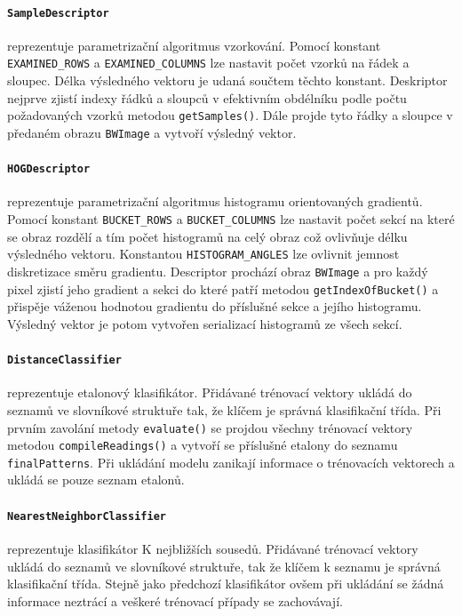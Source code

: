 \documentclass[12pt]{article}
\begin{document}
\paragraph{\texttt{SampleDescriptor}}
reprezentuje parametrizační algoritmus vzorkování. Pomocí konstant \texttt{EXAMINED\_ROWS} a \texttt{EXAMINED\_COLUMNS} lze nastavit počet vzorků na řádek a sloupec. Délka výsledného vektoru je udaná součtem těchto konstant. Deskriptor nejprve zjistí indexy řádků a sloupců v efektivním obdélníku podle počtu požadovaných vzorků metodou \texttt{getSamples()}. Dále projde tyto řádky a sloupce v předaném obrazu \texttt{BWImage} a vytvoří výsledný vektor.

\paragraph{\texttt{HOGDescriptor}}
reprezentuje parametrizační algoritmus histogramu orientovaných gradientů. Pomocí konstant \texttt{BUCKET\_ROWS} a \texttt{BUCKET\_COLUMNS} lze nastavit počet sekcí na které se obraz rozdělí a tím počet histogramů na celý obraz což ovlivňuje délku výsledného vektoru. Konstantou \texttt{HISTOGRAM\_ANGLES} lze ovlivnit jemnost diskretizace směru gradientu. Descriptor prochází obraz \texttt{BWImage} a pro každý pixel zjistí jeho gradient a sekci do které patří metodou \texttt{getIndexOfBucket()} a přispěje váženou hodnotou gradientu do příslušné sekce a jejího histogramu. Výsledný vektor je potom vytvořen serializací histogramů ze všech sekcí.

\paragraph{\texttt{\texttt{DistanceClassifier}}}
reprezentuje etalonový klasifikátor. Přidávané trénovací vektory ukládá do seznamů ve slovníkové struktuře tak, že klíčem je správná klasifikační třída. Při prvním zavolání metody \texttt{evaluate()} se projdou všechny trénovací vektory metodou \texttt{compileReadings()} a vytvoří se příslušné etalony do seznamu \texttt{finalPatterns}. Při ukládání modelu zanikají informace o trénovacích vektorech a ukládá se pouze seznam etalonů.

\paragraph{\texttt{NearestNeighborClassifier}}
reprezentuje klasifikátor K nejbližších sousedů.
Přidávané trénovací vektory ukládá do seznamů ve slovníkové struktuře, tak že klíčem k seznamu je správná klasifikační třída. Stejně jako předchozí klasifikátor ovšem při ukládání se žádná informace neztrácí a veškeré trénovací případy se zachovávají.
\end{document}
